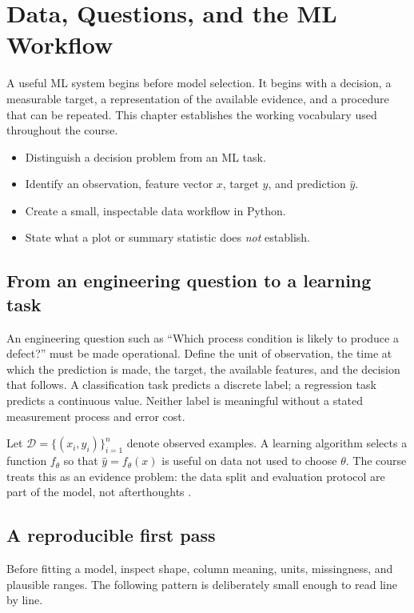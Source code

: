 \chapter{Data, Questions, and the ML Workflow}\label{chap:data-workflow}
 A useful ML system begins before model selection. It begins with a decision, a measurable target, a representation of the available evidence, and a procedure that can be repeated. This chapter establishes the working vocabulary used throughout the course.

\begin{learningbox}
\begin{itemize}
  \item Distinguish a decision problem from an ML task.
  \item Identify an observation, feature vector $x$, target $y$, and prediction $\hat{y}$.
  \item Create a small, inspectable data workflow in Python.
  \item State what a plot or summary statistic does \emph{not} establish.
\end{itemize}
\end{learningbox}

\section{From an engineering question to a learning task}
An engineering question such as ``Which process condition is likely to produce a defect?'' must be made operational. Define the unit of observation, the time at which the prediction is made, the target, the available features, and the decision that follows. A classification task predicts a discrete label; a regression task predicts a continuous value. Neither label is meaningful without a stated measurement process and error cost.

Let $\mathcal{D}=\{(x_i,y_i)\}_{i=1}^{n}$ denote observed examples. A learning algorithm selects a function $f_\theta$ so that $\hat{y}=f_\theta(x)$ is useful on data not used to choose $\theta$. The course treats this as an evidence problem: the data split and evaluation protocol are part of the model, not afterthoughts \citep{mitchell1997}.

\section{A reproducible first pass}
Before fitting a model, inspect shape, column meaning, units, missingness, and plausible ranges. The following pattern is deliberately small enough to read line by line.

